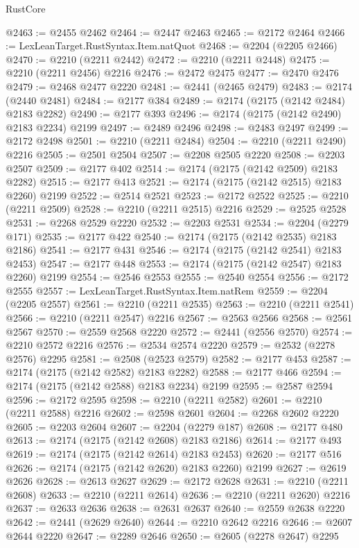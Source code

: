 \begin{lexlean}{RustCore}
\begin{coremodule}
@2463 := @2455 @2462
@2464 := @2447 @2463
@2465 := @2172 @2464
@2466 := LexLeanTarget.RustSyntax.Item.natQuot
@2468 := @2204 (@2205 @2466)
@2470 := @2210 (@2211 @2442)
@2472 := @2210 (@2211 @2448)
@2475 := @2210 (@2211 @2456) @2216
@2476 := @2472 @2475
@2477 := @2470 @2476
@2479 := @2468 @2477 @2220
@2481 := @2441 (@2465 @2479)
@2483 := @2174 (@2440 @2481)
@2484 := @2177 @384
@2489 := @2174 (@2175 (@2142 @2484) @2183 @2282)
@2490 := @2177 @393
@2496 := @2174 (@2175 (@2142 @2490) @2183 @2234) @2199
@2497 := @2489 @2496
@2498 := @2483 @2497
@2499 := @2172 @2498
@2501 := @2210 (@2211 @2484)
@2504 := @2210 (@2211 @2490) @2216
@2505 := @2501 @2504
@2507 := @2208 @2505 @2220
@2508 := @2203 @2507
@2509 := @2177 @402
@2514 := @2174 (@2175 (@2142 @2509) @2183 @2282)
@2515 := @2177 @413
@2521 := @2174 (@2175 (@2142 @2515) @2183 @2260) @2199
@2522 := @2514 @2521
@2523 := @2172 @2522
@2525 := @2210 (@2211 @2509)
@2528 := @2210 (@2211 @2515) @2216
@2529 := @2525 @2528
@2531 := @2268 @2529 @2220
@2532 := @2203 @2531
@2534 := @2204 (@2279 @171)
@2535 := @2177 @422
@2540 := @2174 (@2175 (@2142 @2535) @2183 @2186)
@2541 := @2177 @431
@2546 := @2174 (@2175 (@2142 @2541) @2183 @2453)
@2547 := @2177 @448
@2553 := @2174 (@2175 (@2142 @2547) @2183 @2260) @2199
@2554 := @2546 @2553
@2555 := @2540 @2554
@2556 := @2172 @2555
@2557 := LexLeanTarget.RustSyntax.Item.natRem
@2559 := @2204 (@2205 @2557)
@2561 := @2210 (@2211 @2535)
@2563 := @2210 (@2211 @2541)
@2566 := @2210 (@2211 @2547) @2216
@2567 := @2563 @2566
@2568 := @2561 @2567
@2570 := @2559 @2568 @2220
@2572 := @2441 (@2556 @2570)
@2574 := @2210 @2572 @2216
@2576 := @2534 @2574 @2220
@2579 := @2532 (@2278 @2576) @2295
@2581 := @2508 (@2523 @2579)
@2582 := @2177 @453
@2587 := @2174 (@2175 (@2142 @2582) @2183 @2282)
@2588 := @2177 @466
@2594 := @2174 (@2175 (@2142 @2588) @2183 @2234) @2199
@2595 := @2587 @2594
@2596 := @2172 @2595
@2598 := @2210 (@2211 @2582)
@2601 := @2210 (@2211 @2588) @2216
@2602 := @2598 @2601
@2604 := @2268 @2602 @2220
@2605 := @2203 @2604
@2607 := @2204 (@2279 @187)
@2608 := @2177 @480
@2613 := @2174 (@2175 (@2142 @2608) @2183 @2186)
@2614 := @2177 @493
@2619 := @2174 (@2175 (@2142 @2614) @2183 @2453)
@2620 := @2177 @516
@2626 := @2174 (@2175 (@2142 @2620) @2183 @2260) @2199
@2627 := @2619 @2626
@2628 := @2613 @2627
@2629 := @2172 @2628
@2631 := @2210 (@2211 @2608)
@2633 := @2210 (@2211 @2614)
@2636 := @2210 (@2211 @2620) @2216
@2637 := @2633 @2636
@2638 := @2631 @2637
@2640 := @2559 @2638 @2220
@2642 := @2441 (@2629 @2640)
@2644 := @2210 @2642 @2216
@2646 := @2607 @2644 @2220
@2647 := @2289 @2646
@2650 := @2605 (@2278 @2647) @2295

\end{coremodule}
\end{lexlean}

